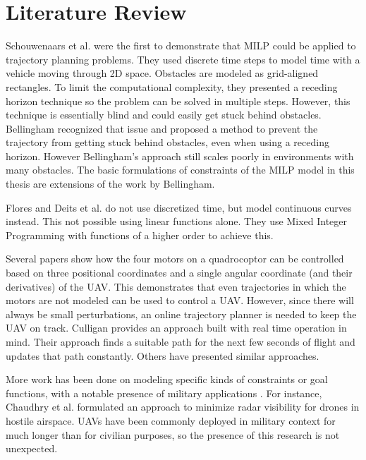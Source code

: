 \section{Literature Review}
\label{subsec:previous}
Schouwenaars et al.\cite{Schouwenaars2001} were the first to demonstrate that MILP could be applied to trajectory planning problems. They used discrete time steps to model time with a vehicle moving through 2D space. Obstacles are modeled as grid-aligned rectangles. To limit the computational complexity, they presented a receding horizon technique so the problem can be solved in multiple steps. However, this technique is essentially blind and could easily get stuck behind obstacles. Bellingham\cite{Bellingham2002} recognized that issue and proposed a method to prevent the trajectory from getting stuck behind obstacles, even when using a receding horizon. However Bellingham's approach still scales poorly in environments with many obstacles. The basic formulations of constraints of the MILP model in this thesis are extensions of the work by Bellingham.
\par
Flores\cite{Flores2007} and Deits et al.\cite{Deits2015} do not use discretized time, but model continuous curves instead. This not possible using linear functions alone. They use Mixed Integer Programming with functions of a higher order to achieve this. 
\par
Several papers \cite{Fliess1995a, Hao2005, Cowling2007, Mellinger2011} show how the four motors on a quadrocoptor can be controlled based on three positional coordinates and a single angular coordinate (and their derivatives) of the UAV. This demonstrates that even trajectories in which the motors are not modeled can be used to control a UAV. However, since there will always be small perturbations, an online trajectory planner is needed to keep the UAV on track. Culligan \cite{Culligan2006} provides an approach built with real time operation in mind. Their approach finds a suitable path for the next few seconds of flight and updates that path constantly. Others \cite{Kamal2005} \cite{Luders2008} have presented similar approaches.
\par
More work has been done on modeling specific kinds of constraints or goal functions, with a notable presence of military applications \cite{Maillot2015}\cite{Chaudhuri2015}. For instance, Chaudhry et al. \cite{Chaudhry2004} formulated an approach to minimize radar visibility for drones in hostile airspace. UAVs have been  commonly deployed in military context for much longer than for civilian purposes, so the presence of this research is not unexpected.

